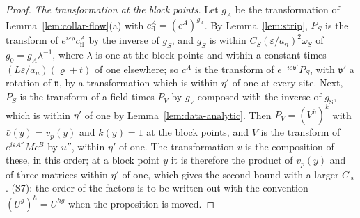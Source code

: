 \begin{proof}
\emph{The transformation at the block points.} Let $g_A$ be the transformation of Lemma~\ref{lem:collar-flow}(a) with $c^A_{\mathrm{fl}} = (c^A)^{g_A}$. By Lemma~\ref{lem:strip}, $P_S$ is the transform of $e^{i\varepsilon\mathfrak v}c^A_{\mathrm{fl}}$ by the inverse of $g_S$, and $g_S$ is within $C_S(\varepsilon/a_n)^2\omega_S$ of $g_0 = g_A\lambda^{-1}$, where $\lambda$ is one at the block points and within a constant times $(L\varepsilon/a_n)(\varrho + t)$ of one elsewhere; so $c^A$ is the transform of $e^{-i\varepsilon\mathfrak v'}P_S$, with $\mathfrak v'$ a rotation of $\mathfrak v$, by a transformation which is within $\eta'$ of one at every site. Next, $P_S$ is the transform of a field times $P_V$ by $g_V$ composed with the inverse of $g_{\mathrm S}$, which is within $\eta'$ of one by Lemma~\ref{lem:data-analytic}. Then $P_V = (V^{\bar\upsilon})^k$ with $\bar\upsilon(y) = v_p(y)$ and $k(y) = 1$ at the block points, and $V$ is the transform of $e^{i\varepsilon A''}Mc^B$ by $u''$, within $\eta'$ of one. The transformation $v$ is the composition of these, in this order; at a block point $y$ it is therefore the product of $v_p(y)$ and of three matrices within $\eta'$ of one, which gives the second bound with a larger $C_{\mathrm{ls}}$. (S7): the order of the factors is to be written out with the convention $(U^g)^h = U^{hg}$ when the proposition is moved.


\end{proof}
